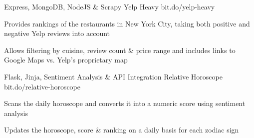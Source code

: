 

\begin{cventries}

 \cventry
    {Express, MongoDB, NodeJS \& Scrapy} %
    {Yelp Heavy} %
    {bit.do/yelp-heavy} %
    {} %
    {
      \begin{cvitems} %
        \item {Provides rankings of the restaurants in New York City, taking both positive and negative Yelp reviews into account}
        \item {Allows filtering by cuisine, review count \& price range and includes links to Google Maps vs. Yelp's proprietary map}
      \end{cvitems}
    }

 \cventry
    {Flask, Jinja, Sentiment Analysis \& API Integration} %
    {Relative Horoscope} %
    {bit.do/relative-horoscope} %
    {} %
    {
      \begin{cvitems} %
        \item {Scans the daily horoscope and converts it into a numeric score using sentiment analysis}
        \item {Updates the horoscope, score \& ranking on a daily basis for each zodiac sign}
      \end{cvitems}
    }

\end{cventries}
